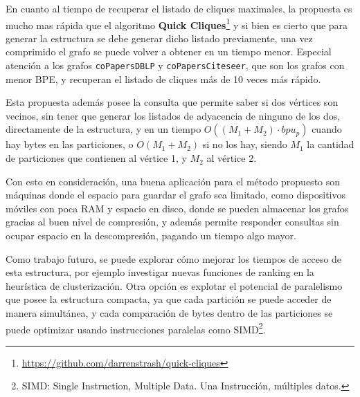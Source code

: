 En cuanto al tiempo de recuperar el listado de cliques maximales, la propuesta es mucho mas rápida que el algoritmo \textbf{Quick Cliques}\footnote{\url{https://github.com/darrenstrash/quick-cliques}} y si bien es cierto que para generar la estructura se debe generar dicho listado previamente, una vez comprimido el grafo se puede volver a obtener en un tiempo menor. Especial atención a los grafos \texttt{coPapersDBLP} y \texttt{coPapersCiteseer}, que son los grafos con menor BPE, y recuperan el listado de cliques más de 10 veces más rápido.

Esta propuesta además posee la consulta que permite saber si dos vértices son vecinos, sin tener que generar los listados de adyacencia de ninguno de los dos, directamente de la estructura, y en un tiempo  $O((M_{1} + M_{2}) \cdot bpu_{p})$ cuando hay bytes en las particiones, o $O(M_{1} + M_{2})$ si no los hay, siendo $M_{1}$ la cantidad de particiones que contienen al vértice 1, y $M_{2}$ al vértice 2. 

Con esto en consideración, una buena aplicación para el método propuesto son máquinas donde el espacio para guardar el grafo sea limitado, como dispositivos móviles con poca RAM y espacio en disco, donde se pueden almacenar los grafos gracias al buen nivel de compresión, y además permite responder consultas sin ocupar espacio en la descompresión, pagando un tiempo algo mayor.

Como trabajo futuro, se puede explorar cómo mejorar los tiempos de acceso de esta estructura, por ejemplo investigar nuevas funciones de ranking en la heurística de clusterización. Otra opción es explotar el potencial de paralelismo que posee la estructura compacta, ya que cada partición se puede acceder de manera simultánea, y cada comparación de bytes dentro de las particiones se puede optimizar usando instrucciones paralelas como SIMD\footnote{SIMD: Single Instruction, Multiple Data. Una Instrucción, múltiples datos.}.

